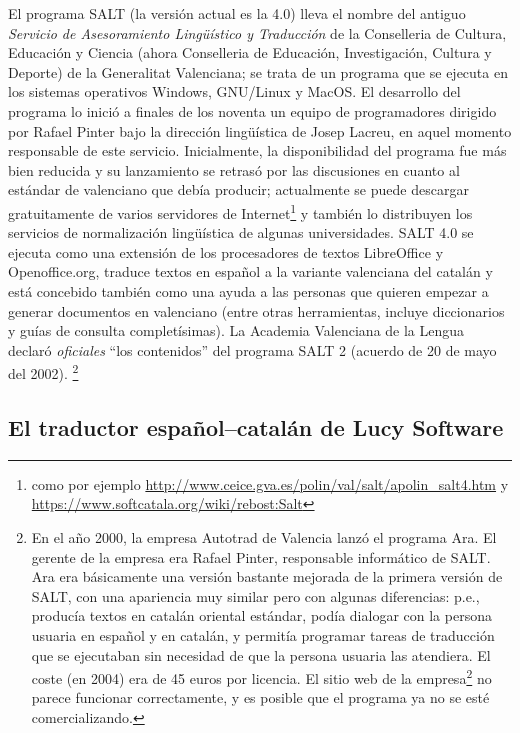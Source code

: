 El programa SALT (la versión actual es la 4.0) lleva el nombre del antiguo \emph{Servicio de Asesoramiento Lingüístico y Traducción} de la Conselleria de Cultura, Educación y Ciencia (ahora Conselleria de Educación, Investigación, Cultura y Deporte) de la Generalitat Valenciana; se trata de un programa que se ejecuta en los sistemas operativos Windows, GNU/Linux y MacOS. El desarrollo del programa lo inició a finales de los noventa un equipo de programadores dirigido por Rafael Pinter bajo la dirección lingüística de Josep Lacreu, en aquel momento responsable de este servicio. Inicialmente, la disponibilidad del programa fue más bien reducida y su lanzamiento se retrasó por las discusiones en cuanto al estándar de valenciano que debía producir; actualmente se puede descargar gratuitamente de varios servidores de Internet\footnote{como por ejemplo \url{http://www.ceice.gva.es/polin/val/salt/apolin_salt4.htm} y  \url{https://www.softcatala.org/wiki/rebost:Salt}} y también lo distribuyen los servicios de normalización lingüística de algunas universidades. SALT 4.0 se ejecuta como una extensión de los procesadores de textos LibreOffice y Openoffice.org, traduce textos en español a la variante valenciana del catalán y está concebido también como una ayuda a las personas que quieren empezar a generar documentos en valenciano (entre otras herramientas, incluye diccionarios y guías de consulta completísimas). La Academia Valenciana de la Lengua declaró \emph{oficiales} ``los contenidos'' del programa SALT 2 (acuerdo de 20 de mayo del 2002). \footnote{En el año 2000, la empresa Autotrad de Valencia lanzó el programa Ara. El gerente de la empresa era Rafael Pinter, responsable informático de SALT. Ara era básicamente una versión bastante mejorada de la primera versión de SALT, con una apariencia muy similar pero con algunas diferencias: p.e., producía textos en catalán oriental estándar, podía dialogar con la persona usuaria en español y en catalán, y permitía programar tareas de traducción que se ejecutaban sin necesidad de que la persona usuaria las atendiera. El coste (en 2004) era de 45 euros por licencia. El sitio web de la empresa\footnote{\url{http://www.ara-autotrad.es}} no parece funcionar correctamente, y es posible que el programa ya no se esté comercializando.} 

\subsection{El traductor español--catalán de Lucy Software} 

